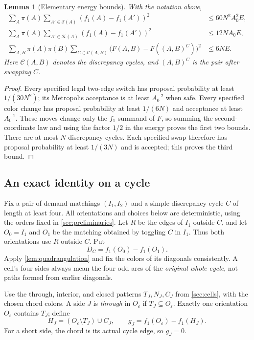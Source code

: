 \documentclass[11pt]{article}
\newtheorem{lemma}[theorem]{Lemma}
\theoremstyle{definition}
\theoremstyle{remark}
\numberwithin{equation}{section}
\begin{document}
\begin{lemma}[Elementary energy bounds]
\label{lem:elementary-pair-energy}
With the notation above,
\begin{align}
 \sum_A\pi(A)\sum_{A'\in\mathcal S(A)}
       (f_1(A)-f_1(A'))^2
 &\le60N^2A_0^2 E,
 \label{eq:safe-switch-energy}\\
 \sum_A\pi(A)\sum_{A'\in\mathcal K(A)}
       (f_1(A)-f_1(A'))^2
 &\le12NA_0 E,
 \label{eq:color-energy}\\
 \sum_{A,B}\pi(A)\pi(B)\sum_{C\in\mathcal C(A,B)}
       \bigl(F(A,B)-F((A,B)^C)\bigr)^2
 &\le6NE.
 \label{eq:cycle-energy}
\end{align}
Here $\mathcal C(A,B)$ denotes the discrepancy cycles, and $(A,B)^C$
is the pair after swapping $C$.
\end{lemma}

\begin{proof}
Every specified legal two-edge switch has proposal probability
at least $1/(30N^2)$; its Metropolis acceptance is at least
$A_0^{-2}$ when safe.  Every specified color change has proposal
probability at least $1/(6N)$ and acceptance at least $A_0^{-1}$.
These moves change only the $f_1$ summand of $F$, so summing the
second-coordinate law and using the factor $1/2$ in the energy proves
the first two bounds.  There are at most $N$ discrepancy cycles.
Each specified swap therefore has proposal probability at least
$1/(3N)$ and is accepted; this proves the third bound.
\end{proof}

\subsection{An exact identity on a cycle}

Fix a pair of demand matchings $(I_1,I_2)$ and a simple discrepancy
cycle $C$ of length at least four.  All orientations and choices below
are deterministic, using the orders fixed in \cref{sec:preliminaries}.
Let $R$ be the edges of $I_1$ outside $C$, and let $O_0=I_1$ and
$O_1$ be the matching obtained by toggling $C$ in $I_1$.  Thus both
orientations use $R$ outside $C$.  Put
\[
 D_C=f_1(O_0)-f_1(O_1).
\]
Apply \cref{lem:quadrangulation} and fix the colors of its diagonals
consistently.  A cell's four sides always mean the four odd arcs of
the \emph{original whole cycle}, not paths formed from earlier
diagonals.

Use the through, interior, and closed patterns $T_J,N_J,C_J$ from
\cref{sec:cells}, with the chosen chord colors. A side $J$ is
\emph{through} in $O_\varepsilon$ if $T_J\subseteq O_\varepsilon$.
Exactly one orientation $O_\varepsilon$ contains $T_J$; define
\begin{equation}
\label{eq:canonical-gain}
 H_J=(O_\varepsilon\setminus T_J)\cup C_J,
 \qquad g_J=f_1(O_\varepsilon)-f_1(H_J).
\end{equation}
For a short side, the chord is its actual cycle edge, so $g_J=0$.
\end{document}
